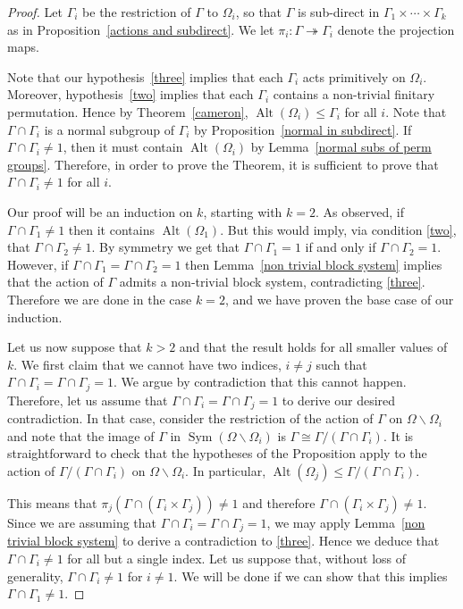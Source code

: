\documentclass[11pt,a4paper]{amsart}
\renewcommand{\setminus}{\smallsetminus}
\theoremstyle{definition}
\theoremstyle{remark}
\newcommand{\Sym}{\operatorname{Sym}}
\newcommand{\Alt}{\operatorname{Alt}}
\begin{document}
\begin{proof} 
Let $\Gamma_i$ be the restriction of $\Gamma$ to $\Omega_i$, so that $\Gamma$ is sub-direct in $\Gamma_1 \times \cdots \times \Gamma_k$ as in Proposition~\ref{actions and subdirect}. We let $\pi_i: \Gamma \twoheadrightarrow \Gamma_i$ denote the projection maps. 
		
	Note that our hypothesis~\ref{three} implies that each $\Gamma_i$ acts primitively on $\Omega_i$. Moreover, hypothesis~\ref{two} implies that each $\Gamma_i$ contains a non-trivial finitary permutation. Hence by Theorem~\ref{cameron}, $\Alt(\Omega_i) \leq \Gamma_i$ for all $i$. Note that $\Gamma \cap \Gamma_i$ is a normal subgroup of $\Gamma_i$ by Proposition~\ref{normal in subdirect}. If $\Gamma \cap \Gamma_i \neq1$, then it must contain $\Alt(\Omega_i)$ by Lemma~\ref{normal subs of perm groups}. Therefore, in order to prove the Theorem, it is sufficient to prove that $\Gamma \cap \Gamma_i \neq 1$ for all $i$. 
	
	
	
	
	Our proof will be an induction on $k$, starting with $k=2$. As observed, if $\Gamma \cap \Gamma_1 \neq 1$ then it contains $\Alt(\Omega_1)$. But this would imply, via condition \ref{two}, that $\Gamma \cap \Gamma_2 \neq 1$. By symmetry we get that $\Gamma \cap \Gamma_1 = 1$ if and only if $\Gamma \cap \Gamma_2 = 1$. However, if $\Gamma \cap \Gamma_1 = \Gamma \cap \Gamma_2=1$ then Lemma~\ref{non trivial block system} implies that the action of $\Gamma$ admits a non-trivial block system, contradicting \ref{three}. Therefore we are done in the case $k=2$, and we have proven the base case of our induction. 
	
	Let us now suppose that $k > 2$ and that the result holds for all smaller values of $k$. We first claim that we cannot have two indices, $i \neq j$ such that $\Gamma \cap \Gamma_i = \Gamma \cap \Gamma_j = 1$. We argue by contradiction that this cannot happen. Therefore, let us assume that $\Gamma \cap \Gamma_i = \Gamma \cap \Gamma_j = 1$ to derive our desired contradiction. In that case, consider the restriction of the action of $\Gamma$ on $\Omega \setminus\Omega_i$ and note that the image of $\Gamma$ in $\Sym(\Omega \setminus \Omega_i)$ is $\Gamma \cong \Gamma/(\Gamma \cap \Gamma_i)$. It is straightforward to check that the hypotheses of the Proposition apply to the action of  $\Gamma/(\Gamma \cap \Gamma_i)$ on $\Omega \setminus\Omega_i$. In particular, $\Alt(\Omega_j) \leq \Gamma/(\Gamma \cap \Gamma_i)$. 
	
	
	This means that $\pi_j( \Gamma \cap (\Gamma_i \times \Gamma_j)) \neq 1$ and therefore $ \Gamma \cap (\Gamma_i \times \Gamma_j) \neq 1$. Since we are assuming that $\Gamma \cap \Gamma_i = \Gamma \cap \Gamma_j = 1$, we may apply Lemma~\ref{non trivial block system} to derive a contradiction to \ref{three}. Hence we deduce that $\Gamma \cap \Gamma_i \neq 1$ for all but a single index. Let us suppose that, without loss of generality, $\Gamma \cap \Gamma_i \neq 1$ for $i \neq 1$. We will be done if we can show that this implies $\Gamma \cap \Gamma_1 \neq 1$. 
	

\end{proof}
\end{document}
